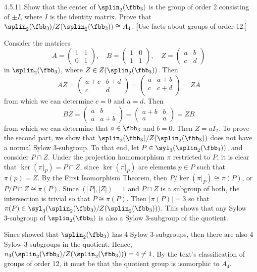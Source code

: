 \begin{exercise}{4.5.11}
	Show that the center of $\splin_2(\fbb_3)$ is the group of order 2 consisting of $\pm I$, where $I$ is the identity matrix.
	Prove that $\splin_2(\fbb_3)/Z(\splin_2(\fbb_3)) \cong A_4$. [Use facts about groups of order 12.]
\end{exercise}

\begin{sol}
	Consider the matrices
	\[
		A = 
		\begin{pmatrix}
			1 & 1 \\
			0 & 1
		\end{pmatrix}, \quad 
		B = 
		\begin{pmatrix}
			1 & 0 \\
			1 & 1
		\end{pmatrix}, \quad
		Z = 
		\begin{pmatrix}
			a & b \\
			c & d
		\end{pmatrix}
	\]
	in $\splin_2(\fbb_3)$, where $Z \in Z(\splin_2(\fbb_3))$.
	Then
	\[
		AZ = 
		\begin{pmatrix}
			a + c & b + d \\
			c & d
		\end{pmatrix} = 
		\begin{pmatrix}
			a & a + b \\
			c & c + d \\
		\end{pmatrix} = ZA
	\]
	from which we can determine $c = 0$ and $a = d$.
	Then
	\[
		BZ = 
		\begin{pmatrix}
			a & b \\
			a & a + b
		\end{pmatrix} = 
		\begin{pmatrix}
			a + b & b \\
			a & a
		\end{pmatrix} = ZB
	\]
	from which we can determine that $a \in \fbb_3$ and $b = 0$.
	Then $Z = aI_2$.
	To prove the second part, we show that $\splin_2(\fbb_3)/Z(\splin_2(\fbb_3))$ does not have a normal Sylow 3-subgroup.
	To that end, let $P \in \syl_3(\splin_2(\fbb_3))$, and consider $P \cap Z$.
	Under the projection homomorphism $\pi$ restricted to $P$, it is clear that $\ker(\pi|_P) = P \cap Z$, since $\ker(\pi|_P)$ are elements $p \in P$ such that $\pi(p) = Z$.
	By the First Isomorphism Theorem, then $P/\ker(\pi|_P) \cong \pi(P)$, or $P/P \cap Z \cong \pi(P)$.
	Since $(|P|, |Z|) = 1$ and $P \cap Z$ is a subgroup of both, the intersection is trivial so that $P \cong \pi(P)$.
	Then $|\pi(P)| = 3$ so that $\pi(P) \in \syl_3(\splin_2(\fbb_3)/Z(\splin_2(\fbb_3)))$.
	This shows that any Sylow 3-subgroup of $\splin_2(\fbb_3)$ is also a Sylow 3-subgroup of the quotient.

	Since  showed that $\splin_2(\fbb_3)$ has 4 Sylow 3-subgroups, then there are also 4 Sylow 3-subgroups in the quotient.
	Hence, $n_3(\splin_2(\fbb_3)/Z(\splin_2(\fbb_3))) = 4 \neq 1$.
	By the text's classification of groups of order 12, it must be that the quotient group is isomorphic to $A_4$.
\end{sol}

